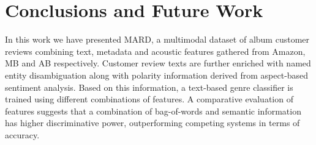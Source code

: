 
\section{Conclusions and Future Work}
In this work we have presented MARD, a multimodal dataset of album customer reviews combining text, metadata and acoustic features gathered from Amazon, MB and AB respectively. Customer review texts are further enriched with named entity disambiguation along with polarity information derived from aspect-based sentiment analysis. Based on this information, a text-based genre classifier is trained using different combinations of features. %
A comparative evaluation of features suggests that a combination of bag-of-words and semantic information has higher discriminative power, outperforming competing systems in terms of accuracy.
